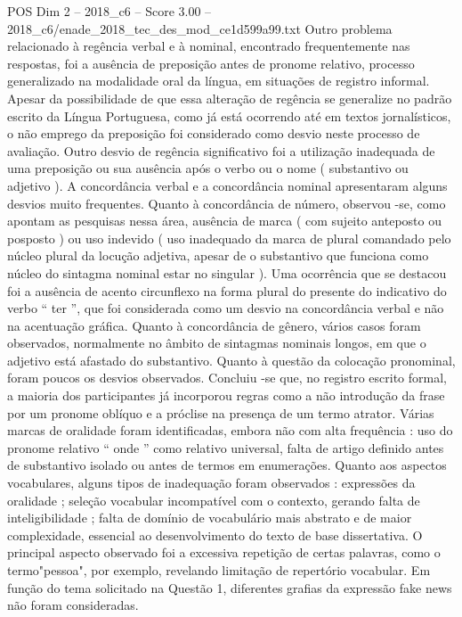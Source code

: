 \begin{textsample}{POS Dim 2 – 2018\_c6 – Score 3.00 – 2018\_c6/enade\_2018\_tec\_des\_mod\_ce1d599a99.txt}
Outro problema relacionado à regência verbal e à nominal, encontrado frequentemente nas respostas, foi a ausência de preposição antes de pronome relativo, processo generalizado na modalidade oral da língua, em situações de registro informal.
Apesar da possibilidade de que essa alteração de regência se generalize no padrão escrito da Língua Portuguesa, como já está ocorrendo até em textos jornalísticos, o não emprego da preposição foi considerado como desvio neste processo de avaliação.
Outro desvio de regência significativo foi a utilização inadequada de uma preposição ou sua ausência após o verbo ou o nome ( substantivo ou adjetivo ).
A concordância verbal e a concordância nominal apresentaram alguns desvios muito frequentes.
Quanto à concordância de número, observou -se, como apontam as pesquisas nessa área, ausência de marca ( com sujeito anteposto ou posposto ) ou uso indevido ( uso inadequado da marca de plural comandado pelo núcleo plural da locução adjetiva, apesar de o substantivo que funciona como núcleo do sintagma nominal estar no singular ).
Uma ocorrência que se destacou foi a ausência de acento circunflexo na forma plural do presente do indicativo do verbo “ ter ”, que foi considerada como um desvio na concordância verbal e não na acentuação gráfica.
Quanto à concordância de gênero, vários casos foram observados, normalmente no âmbito de sintagmas nominais longos, em que o adjetivo está afastado do substantivo.
Quanto à questão da colocação pronominal, foram poucos os desvios observados.
Concluiu -se que, no registro escrito formal, a maioria dos participantes já incorporou regras como a não introdução da frase por um pronome oblíquo e a próclise na presença de um termo atrator.
Várias marcas de oralidade foram identificadas, embora não com alta frequência : uso do pronome relativo “ onde ” como relativo universal, falta de artigo definido antes de substantivo isolado ou antes de termos em enumerações.
Quanto aos aspectos vocabulares, alguns tipos de inadequação foram observados : expressões da oralidade ; seleção vocabular incompatível com o contexto, gerando falta de inteligibilidade ; falta de domínio de vocabulário mais abstrato e de maior complexidade, essencial ao desenvolvimento do texto de base dissertativa.
O principal aspecto observado foi a excessiva repetição de certas palavras, como o termo"pessoa", por exemplo, revelando limitação de repertório vocabular.
Em função do tema solicitado na Questão 1, diferentes grafias da expressão fake news não foram consideradas.

\end{textsample}
